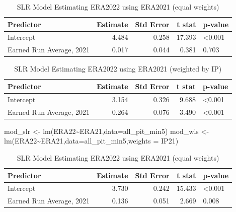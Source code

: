 \documentclass[
  11pt,
]{book}
\newenvironment{Shaded}{\begin{snugshade}}{\end{snugshade}}
\newcommand{\AttributeTok}[1]{\textcolor[rgb]{0.77,0.63,0.00}{#1}}
\newcommand{\FunctionTok}[1]{\textcolor[rgb]{0.00,0.00,0.00}{#1}}
\newcommand{\NormalTok}[1]{#1}
\newcommand{\OtherTok}[1]{\textcolor[rgb]{0.56,0.35,0.01}{#1}}
\newcommand{\SpecialCharTok}[1]{\textcolor[rgb]{0.00,0.00,0.00}{#1}}
\theoremstyle{definition}
\theoremstyle{definition}
\theoremstyle{definition}
\theoremstyle{definition}
\theoremstyle{remark}
\begin{document}
\begin{table}[!h]

\caption{\label{tab:unnamed-chunk-271}SLR Model Estimating ERA2022 using ERA2021 (equal weights)}
\centering
\begin{tabular}[t]{lrrrl}
\toprule
Predictor & Estimate & Std Error & t stat & p-value\\
\midrule
Intercept & 4.484 & 0.258 & 17.393 & <0.001\\
Earned Run Average, 2021 & 0.017 & 0.044 & 0.381 & 0.703\\
\bottomrule
\end{tabular}
\end{table}

\begin{table}[!h]

\caption{\label{tab:unnamed-chunk-272}SLR Model Estimating ERA2022 using ERA2021 (weighted by IP)}
\centering
\begin{tabular}[t]{lrrrl}
\toprule
Predictor & Estimate & Std Error & t stat & p-value\\
\midrule
Intercept & 3.154 & 0.326 & 9.688 & <0.001\\
Earned Run Average, 2021 & 0.264 & 0.076 & 3.490 & <0.001\\
\bottomrule
\end{tabular}
\end{table}

\begin{Shaded}
\begin{Highlighting}[]
\NormalTok{mod\_slr }\OtherTok{\textless{}{-}} \FunctionTok{lm}\NormalTok{(ERA22}\SpecialCharTok{\textasciitilde{}}\NormalTok{ERA21,}\AttributeTok{data=}\NormalTok{all\_pit\_min5)}
\NormalTok{mod\_wls }\OtherTok{\textless{}{-}} \FunctionTok{lm}\NormalTok{(ERA22}\SpecialCharTok{\textasciitilde{}}\NormalTok{ERA21,}\AttributeTok{data=}\NormalTok{all\_pit\_min5,}\AttributeTok{weights =}\NormalTok{ IP21)}
\end{Highlighting}
\end{Shaded}

\begin{table}[!h]

\caption{\label{tab:unnamed-chunk-274}SLR Model Estimating ERA2022 using ERA2021 (equal weights)}
\centering
\begin{tabular}[t]{lrrrl}
\toprule
Predictor & Estimate & Std Error & t stat & p-value\\
\midrule
Intercept & 3.730 & 0.242 & 15.433 & <0.001\\
Earned Run Average, 2021 & 0.136 & 0.051 & 2.669 & 0.008\\
\bottomrule
\end{tabular}
\end{table}
\end{document}
